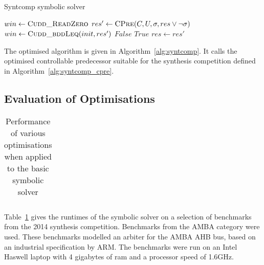\begin{algorithm}
\caption{Syntcomp symbolic solver}
\label{alg:syntcomp}

\begin{algorithmic}


    \State $win \gets \Call{Cudd\_ReadZero}{}$
    \Loop
        \State $res' \gets \Call{CPre}{C, U, \sigma, res \lor \neg \sigma}$
        \State $win  \gets \Call{Cudd\_bddLeq}{init, res'}$
            \State \Return $False$
        \EndIf
            \State \Return $True$
        \EndIf
        \State $res \gets res'$
    \EndLoop

\EndFunction

\end{algorithmic}
\end{algorithm}

The optimised algorithm is given in Algorithm~\ref{alg:syntcomp}. It calls the optimised controllable predecessor suitable for the synthesis competition defined in Algorithm~\ref{alg:syntcomp_cpre}.

\subsection{Evaluation of Optimisations}
\label{sec:syntcomp_eval}

\begin{table}
    \begin{tabular}{l|l|l|l|l|l|l|}
    \end{tabular}
    \caption{Performance of various optimisations when applied to the basic symbolic solver}
    \label{tab:syntcomp_optimisations}
\end{table}


Table~\ref{tab:syntcomp_optimisations} gives the runtimes of the symbolic solver on a selection of benchmarks from the 2014 synthesis competition. Benchmarks from the AMBA category were used. These benchmarks modelled an arbiter for the AMBA AHB bus, based on an industrial specification by ARM. The benchmarks were run on an Intel Haswell laptop with 4 gigabytes of ram and a processor speed of 1.6GHz.

